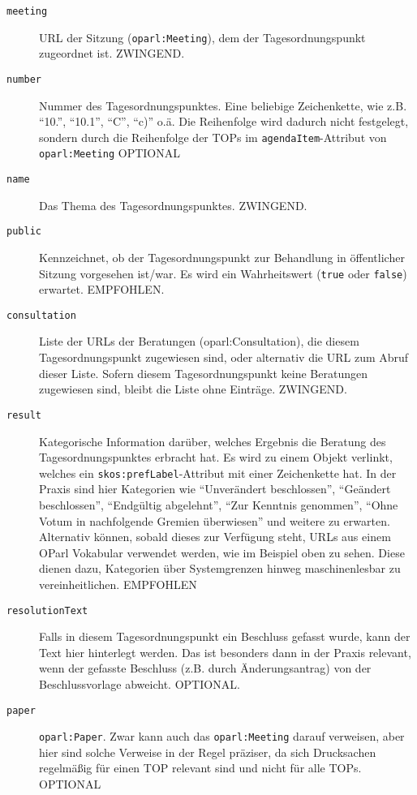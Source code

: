 \documentclass[,a4paper]{article}
\begin{document}
\begin{description}
\item[\texttt{meeting}]
URL der Sitzung (\texttt{oparl:Meeting}), dem der Tagesordnungspunkt
zugeordnet ist. ZWINGEND.
\item[\texttt{number}]
Nummer des Tagesordnungspunktes. Eine beliebige Zeichenkette, wie z.B.
``10.'', ``10.1'', ``C'', ``c)'' o.ä. Die Reihenfolge wird dadurch nicht
festgelegt, sondern durch die Reihenfolge der TOPs im
\texttt{agendaItem}-Attribut von \texttt{oparl:Meeting} OPTIONAL
\item[\texttt{name}]
Das Thema des Tagesordnungspunktes. ZWINGEND.
\item[\texttt{public}]
Kennzeichnet, ob der Tagesordnungspunkt zur Behandlung in öffentlicher
Sitzung vorgesehen ist/war. Es wird ein Wahrheitswert (\texttt{true}
oder \texttt{false}) erwartet. EMPFOHLEN.
\item[\texttt{consultation}]
Liste der URLs der Beratungen (oparl:Consultation), die diesem
Tagesordnungspunkt zugewiesen sind, oder alternativ die URL zum Abruf
dieser Liste. Sofern diesem Tagesordnungspunkt keine Beratungen
zugewiesen sind, bleibt die Liste ohne Einträge. ZWINGEND.
\item[\texttt{result}]
Kategorische Information darüber, welches Ergebnis die Beratung des
Tagesordnungspunktes erbracht hat. Es wird zu einem Objekt verlinkt,
welches ein \texttt{skos:prefLabel}-Attribut mit einer Zeichenkette hat.
In der Praxis sind hier Kategorien wie ``Unverändert beschlossen'',
``Geändert beschlossen'', ``Endgültig abgelehnt'', ``Zur Kenntnis
genommen'', ``Ohne Votum in nachfolgende Gremien überwiesen'' und
weitere zu erwarten. Alternativ können, sobald dieses zur Verfügung
steht, URLs aus einem OParl Vokabular verwendet werden, wie im Beispiel
oben zu sehen. Diese dienen dazu, Kategorien über Systemgrenzen hinweg
maschinenlesbar zu vereinheitlichen. EMPFOHLEN
\item[\texttt{resolutionText}]
Falls in diesem Tagesordnungspunkt ein Beschluss gefasst wurde, kann der
Text hier hinterlegt werden. Das ist besonders dann in der Praxis
relevant, wenn der gefasste Beschluss (z.B. durch Änderungsantrag) von
der Beschlussvorlage abweicht. OPTIONAL.
\item[\texttt{paper}]
\texttt{oparl:Paper}. Zwar kann auch das \texttt{oparl:Meeting} darauf
verweisen, aber hier sind solche Verweise in der Regel präziser, da sich
Drucksachen regelmäßig für einen TOP relevant sind und nicht für alle
TOPs. OPTIONAL
\end{description}
\end{document}
